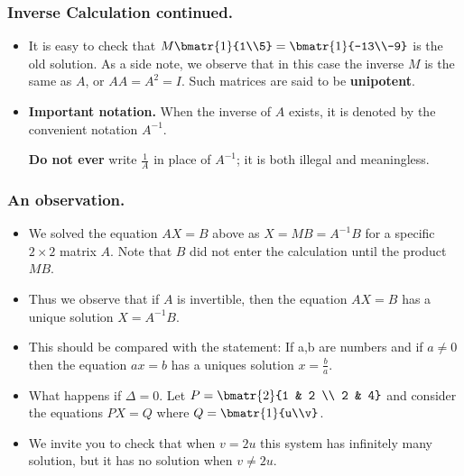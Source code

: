 \begin{frame}%
  \frametitle{Inverse Calculation continued.}
  \begin{itemize}%
 

\item It is easy to check that $M\bmatr{1}{1\\5} = \bmatr{1}{-13\\-9}$
is the old solution.
As a side note, we observe that in this case the inverse $M$ is the same
as $A$, or $AA=A^2=I$. Such matrices are said to be {\bf unipotent}.

\item {\bf Important notation.} When the inverse of $A$ exists, it is
denoted by the convenient notation $A^{-1}$.

{\bf Do not ever } write $\frac{1}{A}$ in place of $A^{-1}$; it is both
illegal and meaningless.

\end{itemize}
\end{frame}


\begin{frame}%
 \frametitle{An observation.}
  \begin{itemize}%

\item We solved the equation $AX=B$ above as $X=MB=A^{-1}B$ for a
specific $2\times 2$ matrix $A$. Note that $B$ did not enter the
calculation until the product $MB$.

\item
Thus we observe that if  $A$ is invertible, then the equation $AX=B$ has
a unique solution $X=A^{-1}B$.

\item This should be compared with the statement:
If a,b are numbers and  if $a\ne 0$ then the equation
$ax=b$ has a uniques solution $x=\frac{b}{a}$.

\item What happens if $\Delta=0$. Let $P=\bmatr{2}{1 & 2 \\ 2 & 4}$ and
consider the equations $PX=Q$ where $Q=\bmatr{1}{u\\v}$.

\item We invite you to check that when $v=2u$ this system has
infinitely many solution, but it has no solution when $v\ne 2u$.


\end{itemize}
 
\end{frame}

